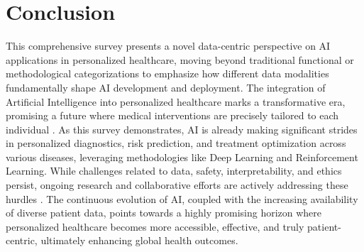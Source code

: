 \documentclass[runningheads]{llncs}
\begin{document}
\section{Conclusion}
This comprehensive survey presents a novel data-centric perspective on AI applications in personalized healthcare, moving beyond traditional functional or methodological categorizations to emphasize how different data modalities fundamentally shape AI development and deployment. The integration of Artificial Intelligence into personalized healthcare marks a transformative era, promising a future where medical interventions are precisely tailored to each individual \cite{alum2025artificial}. As this survey demonstrates, AI is already making significant strides in personalized diagnostics, risk prediction, and treatment optimization across various diseases, leveraging methodologies like Deep Learning and Reinforcement Learning. While challenges related to data, safety, interpretability, and ethics persist, ongoing research and collaborative efforts are actively addressing these hurdles \cite{taherdoost2024ai}. The continuous evolution of AI, coupled with the increasing availability of diverse patient data, points towards a highly promising horizon where personalized healthcare becomes more accessible, effective, and truly patient-centric, ultimately enhancing global health outcomes.



\end{document}
